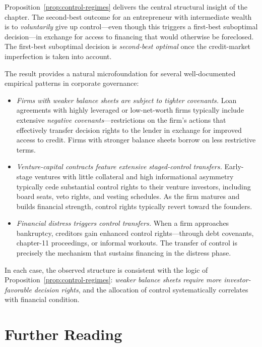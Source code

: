 \documentclass[11pt,a4paper,oneside]{book}
\theoremstyle{plain}
\theoremstyle{definition}
\theoremstyle{remark}
\numberwithin{equation}{chapter}
\begin{document}
Proposition~\ref{prop:control-regimes} delivers the central structural insight of the chapter.
The second-best outcome for an entrepreneur with intermediate wealth is to \emph{voluntarily} give up control---even though this triggers a first-best suboptimal decision---in exchange for access to financing that would otherwise be foreclosed.
The first-best suboptimal decision is \emph{second-best optimal} once the credit-market imperfection is taken into account.

The result provides a natural microfoundation for several well-documented empirical patterns in corporate governance:

\begin{itemize}
  \item \emph{Firms with weaker balance sheets are subject to tighter covenants.}
  Loan agreements with highly leveraged or low-net-worth firms typically include extensive \emph{negative covenants}---restrictions on the firm's actions that effectively transfer decision rights to the lender in exchange for improved access to credit.
  Firms with stronger balance sheets borrow on less restrictive terms.
  \item \emph{Venture-capital contracts feature extensive staged-control transfers.}
  Early-stage ventures with little collateral and high informational asymmetry typically cede substantial control rights to their venture investors, including board seats, veto rights, and vesting schedules.
  As the firm matures and builds financial strength, control rights typically revert toward the founders.
  \item \emph{Financial distress triggers control transfers.}
  When a firm approaches bankruptcy, creditors gain enhanced control rights---through debt covenants, chapter-11 proceedings, or informal workouts.
  The transfer of control is precisely the mechanism that sustains financing in the distress phase.
\end{itemize}

In each case, the observed structure is consistent with the logic of Proposition~\ref{prop:control-regimes}: \emph{weaker balance sheets require more investor-favorable decision rights}, and the allocation of control systematically correlates with financial condition.

\section{Further Reading}
\label{sec:control-further}
\end{document}

